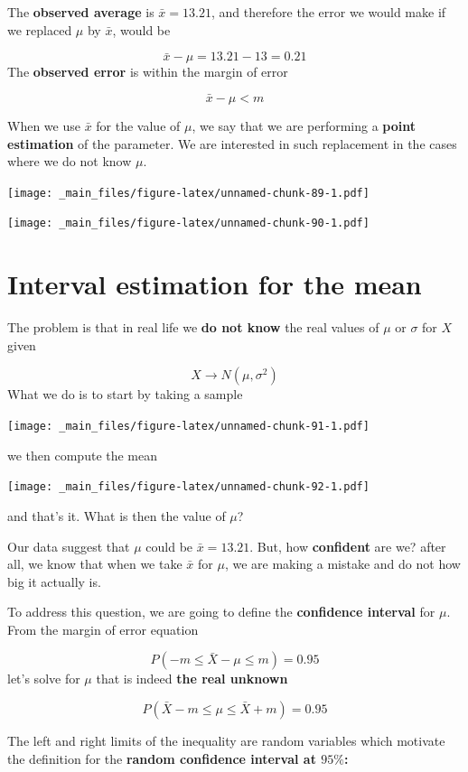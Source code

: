 \documentclass[
]{book}
\begin{document}
The \textbf{observed average} is \(\bar{x}=13.21\), and therefore the error we would make if we replaced \(\mu\) by \(\bar{x}\), would be

\[\bar{x}-\mu=13.21-13=0.21\]
The \textbf{observed error} is within the margin of error

\[\bar{x}-\mu <m\]

When we use \(\bar{x}\) for the value of \(\mu\), we say that we are performing a \textbf{point estimation} of the parameter. We are interested in such replacement in the cases where we do not know \(\mu\).

\texttt{[image: \_main\_files/figure-latex/unnamed-chunk-89-1.pdf]}

\texttt{[image: \_main\_files/figure-latex/unnamed-chunk-90-1.pdf]}

\hypertarget{interval-estimation-for-the-mean}{%
\section{Interval estimation for the mean}\label{interval-estimation-for-the-mean}}

The problem is that in real life we \textbf{do not know} the real values of \(\mu\) or \(\sigma\) for \(X\) given

\[X \rightarrow N(\mu, \sigma^2)\]
What we do is to start by taking a sample

\texttt{[image: \_main\_files/figure-latex/unnamed-chunk-91-1.pdf]}

we then compute the mean

\texttt{[image: \_main\_files/figure-latex/unnamed-chunk-92-1.pdf]}

and that's it. What is then the value of \(\mu\)?

Our data suggest that \(\mu\) could be \(\bar{x}=13.21\). But, how \textbf{confident} are we? after all, we know that when we take \(\bar{x}\) for \(\mu\), we are making a mistake and do not how big it actually is.

To address this question, we are going to define the \textbf{confidence interval} for \(\mu\). From the margin of error equation

\[P(-m \leq \bar{X} - \mu \leq  m)=0.95\]
let's solve for \(\mu\) that is indeed \textbf{the real unknown}

\[P(\bar{X} - m \leq \mu \leq \bar{X} + m)=0.95\]

The left and right limits of the inequality are random variables which motivate the definition for the \textbf{random confidence interval at \(95\%\):}
\end{document}
